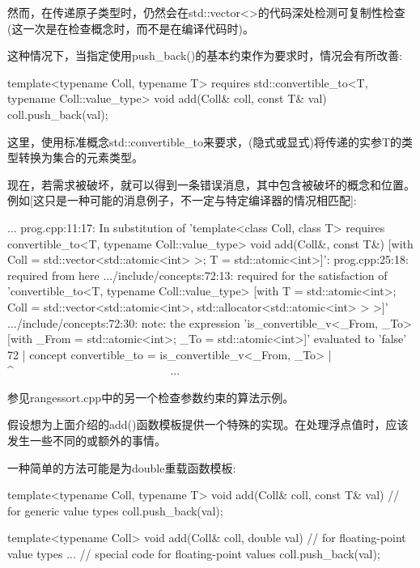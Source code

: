 然而，在传递原子类型时，仍然会在std::vector<>的代码深处检测可复制性检查(这一次是在检查概念时，而不是在编译代码时)。

这种情况下，当指定使用push\_back()的基本约束作为要求时，情况会有所改善:

\begin{cpp}
template<typename Coll, typename T>
requires std::convertible_to<T, typename Coll::value_type>
void add(Coll& coll, const T& val)
{
	coll.push_back(val);
}
\end{cpp}

这里，使用标准概念std::convertible\_to来要求，(隐式或显式)将传递的实参T的类型转换为集合的元素类型。

现在，若需求被破坏，就可以得到一条错误消息，其中包含被破坏的概念和位置。例如[这只是一种可能的消息例子，不一定与特定编译器的情况相匹配]:

{\footnotesize
\begin{shell}
...
prog.cpp:11:17: In substitution of ’template<class Coll, class T>
                 requires convertible_to<T, typename Coll::value_type>
                 void add(Coll&, const T&)
                [with Coll = std::vector<std::atomic<int> >; T = std::atomic<int>]’:
prog.cpp:25:18: required from here
.../include/concepts:72:13: required for the satisfaction of
                 ’convertible_to<T, typename Coll::value_type>
                  [with T = std::atomic<int>;
                      Coll = std::vector<std::atomic<int>,
                                              std::allocator<std::atomic<int> > >]’
.../include/concepts:72:30: note: the expression ’is_convertible_v<_From, _To>
                      [with _From = std::atomic<int>; _To = std::atomic<int>]’
                      evaluated to ’false’
    72 | concept convertible_to = is_convertible_v<_From, _To>
        |                                    ^~~~~~~~~~~~~~~~~~~~~~~~~~~~
...
\end{shell}
}

参见rangessort.cpp中的另一个检查参数约束的算法示例。


假设想为上面介绍的add()函数模板提供一个特殊的实现。在处理浮点值时，应该发生一些不同的或额外的事情。

一种简单的方法可能是为double重载函数模板:

\begin{cpp}
template<typename Coll, typename T>
void add(Coll& coll, const T& val) // for generic value types
{
	coll.push_back(val);
}

template<typename Coll>
void add(Coll& coll, double val) // for floating-point value types
{
	... // special code for floating-point values
	coll.push_back(val);
}
\end{cpp}

